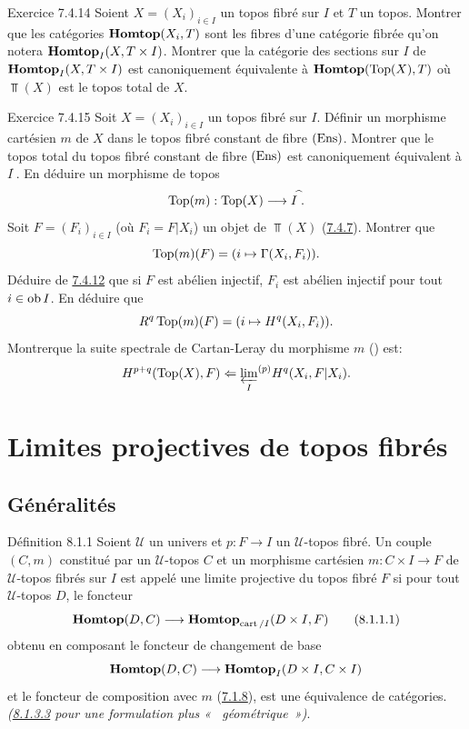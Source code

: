 \documentclass[10pt]{../fichiers-configuration-latex/smfart}
\begin{document}
\begin{enonce*}[remark]{Exercice 7.4.14}
Soient $X = (X_i)_{i \in I}$ un topos fibré sur $I$ et $T$ un
topos. Montrer que les catégories $\operatorname{\mathbf{Homtop}}(X_i, T)$ sont les fibres
d'une catégorie fibrée qu'on notera $\operatorname{\mathbf{Homtop}}_I(X, T\times
I)$. Montrer que la catégorie des sections sur $I$ de $\operatorname{\mathbf{Homtop}}_I(X,
T\times I)$ est canoniquement équivalente à $\operatorname{\mathbf{Homtop}}(\operatorname{Top}(X), T)$
où $\Top(X)$ est le topos total de $X$.
\end{enonce*}

\begin{enonce*}[remark]{Exercice 7.4.15}
Soit $X = (X_i)_{i \in I}$ un topos fibré sur $I$. Définir un
morphisme cartésien $m$ de $X$ dans le topos fibré constant de fibre
$(\operatorname{Ens})$. Montrer que le topos total du topos fibré constant de fibre
$(\operatorname{Ens})$ est canoniquement équivalent à
$I^{\widehat{\phantom{,}}}$. En déduire un morphisme de topos
$$
\Top(m) :\Top(X) \to I^{\widehat{\phantom{,}}}{\quoi}.
$$
Soit $F = (F_i)_{i \in I}$ (où $F_i = F | X_i$) un objet de $\Top(X)$
(\hyperref[VI.prop7.4.7]{7.4.7}). Montrer que
$$
\operatorname{Top}(m)(F) = (i \mapsto \Gamma (X_i, F_i)){}.
$$
Déduire de \hyperref[VI.lem7.4.12]{7.4.12} que si $F$ est abélien injectif, $F_i$ est abélien
injectif pour tout $i \in \operatorname{ob} I$. En déduire que
$$
R^q \operatorname{Top}(m)(F) = (i \mapsto H^{q} (X_i, F_i)){}.
$$
Montrer\pageoriginale que la suite spectrale de Cartan-Leray du
morphisme $m$ () est:
$$
H^{p+q} (\operatorname{Top}(X), F) \Leftarrow {\varprojlim_{I}}^{(p)} H^{q}
(X_i, F|X_i){}.
$$
\end{enonce*}

\section{Limites projectives de topos fibrés}

\subsection{Généralités}

\begin{enonce*}{Définition 8.1.1}
Soient $𝒰$ un univers et $p:F \to I$ un $𝒰$-topos
fibré. Un couple $(C, m)$ constitué par un $𝒰$-topos $C$ et
un morphisme cartésien $m : C \times I \to F$ de $𝒰$-topos
fibrés sur $I$ est appelé une limite projective du topos fibré $F$
si pour tout $𝒰$-topos $D$, le foncteur
\begin{equation*}
\Hhomtop(D, C) \to \Hhomtop_{\cart/I}(D\times I, F)\tag{8.1.1.1}
\end{equation*}
obtenu en composant le foncteur de changement de base
$$
\Hhomtop(D, C) \to \Hhomtop_{I}(D\times I, C \times I)
$$
et le foncteur de composition avec $m$ (\hyperref[VI.subsubsec7.1.8]{7.1.8}), est une équivalence de
catégories. \emph{(\cf \hyperref[VI.par8.1.3.3]{8.1.3.3} pour une formulation plus «   géométrique »)}.
\end{enonce*}
\end{document}
